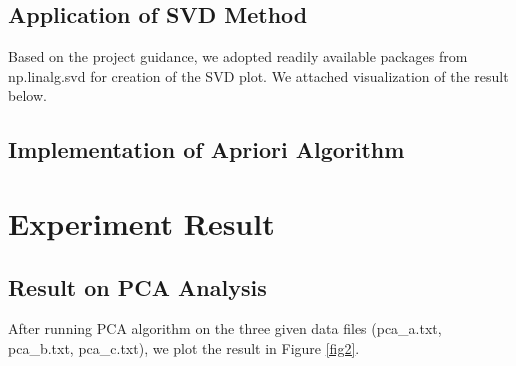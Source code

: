 \documentclass[fleqn]{llncs}
\begin{document}
\subsection{Application of SVD Method} Based on the project guidance, we adopted readily available packages from np.linalg.svd for creation of the SVD plot. We attached visualization of the result below. 



\subsection{Implementation of Apriori Algorithm} 







\section{Experiment Result} 

\subsection{Result on PCA Analysis} After running PCA algorithm on the three given data files (pca\_a.txt, pca\_b.txt, pca\_c.txt), we plot the result in Figure \ref{fig2}. 
\end{document}
